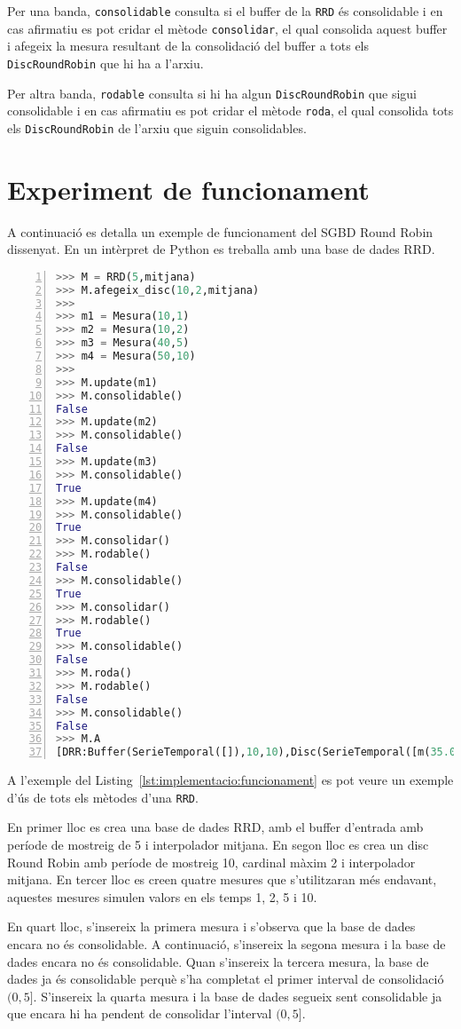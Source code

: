 Per una banda, \verb+consolidable+ consulta si el buffer de la \verb+RRD+ és consolidable i en cas afirmatiu es pot cridar el mètode \verb+consolidar+, el qual consolida aquest buffer i afegeix la mesura resultant de la consolidació del buffer a tots els \verb+DiscRoundRobin+ que hi ha a l'arxiu.

Per altra banda, \verb+rodable+ consulta si hi ha algun \verb+DiscRoundRobin+ que sigui consolidable i en cas afirmatiu es pot cridar el mètode \verb+roda+, el qual consolida tots els \verb+DiscRoundRobin+ de l'arxiu que siguin consolidables.


\section[Funcionament]{Experiment de funcionament}

A continuació es detalla un exemple de funcionament del SGBD Round Robin dissenyat. En un intèrpret de Python es treballa amb una base de dades RRD.

\begin{lstlisting}[float,language=Python,caption=Exemple de funcionament de la implementació en Python de la RRD,label=lst:implementacio:funcionament,numbers=left]
>>> M = RRD(5,mitjana)
>>> M.afegeix_disc(10,2,mitjana)
>>>
>>> m1 = Mesura(10,1)
>>> m2 = Mesura(10,2)
>>> m3 = Mesura(40,5) 
>>> m4 = Mesura(50,10)
>>>
>>> M.update(m1)
>>> M.consolidable()
False
>>> M.update(m2)
>>> M.consolidable()
False
>>> M.update(m3)
>>> M.consolidable()
True
>>> M.update(m4)
>>> M.consolidable()
True
>>> M.consolidar()
>>> M.rodable()
False
>>> M.consolidable()
True
>>> M.consolidar()
>>> M.rodable()
True
>>> M.consolidable()
False
>>> M.roda()
>>> M.rodable()
False
>>> M.consolidable()
False
>>> M.A
[DRR:Buffer(SerieTemporal([]),10,10),Disc(SerieTemporal([m(35.0,10)]), |2|)]
\end{lstlisting}

A l'exemple del Listing~\ref{lst:implementacio:funcionament} es pot veure un exemple d'ús de tots els mètodes d'una \verb+RRD+. 

En primer lloc es crea una base de dades RRD, amb el buffer d'entrada amb període de mostreig de 5 i interpolador mitjana. En segon lloc es crea un disc Round Robin amb període de mostreig 10, cardinal màxim 2 i interpolador mitjana.
En tercer lloc es creen quatre mesures que s'utilitzaran més endavant, aquestes mesures simulen valors en els temps 1, 2, 5 i 10.

En quart lloc, s'insereix la primera mesura i s'observa que la base de dades encara no és consolidable. A continuació, s'insereix la segona mesura i la base de dades encara no és consolidable. Quan s'insereix la tercera mesura, la base de dades ja és consolidable perquè s'ha completat el primer interval de consolidació $(0,5]$. S'insereix la quarta mesura i la base de dades segueix sent consolidable ja que encara hi ha pendent de consolidar l'interval $(0,5]$.

